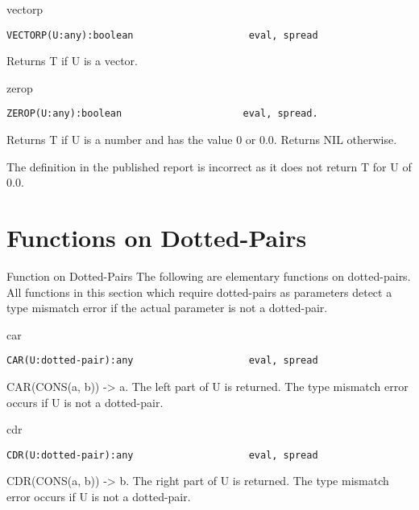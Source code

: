 \begin{Function}{vectorp}
\begin{verbatim}
VECTORP(U:any):boolean                    eval, spread
\end{verbatim}
   Returns T if U is a vector.

\end{Function}
\begin{Function}{zerop}
\begin{verbatim}
ZEROP(U:any):boolean                     eval, spread.
\end{verbatim}
   Returns  T  if U  is a  number  and has  the  value 0  or 0.0.
   Returns NIL otherwise.

     The  definition in the  published report is  incorrect as it
   does not return T for U of 0.0.
\end{Function}

\section{Functions on Dotted-Pairs}
\begin{Introduction}{Function on Dotted-Pairs}
The following are elementary functions on dotted-pairs. All functions
in this section which require dotted-pairs as parameters detect a type
mismatch error if the actual parameter is not a dotted-pair.
\end{Introduction}

\begin{Function}{car}
\begin{verbatim}
CAR(U:dotted-pair):any                    eval, spread
\end{verbatim}
   CAR(CONS(a,  b)) -> a.   The left part of U  is returned.  The
   type mismatch error occurs if U is not a dotted-pair.

\end{Function}
\begin{Function}{cdr}
\begin{verbatim}
CDR(U:dotted-pair):any                    eval, spread
\end{verbatim}
   CDR(CONS(a,  b)) -> b.  The right  part of U is returned.  The
   type mismatch error occurs if U is not a dotted-pair.

\end{Function}

